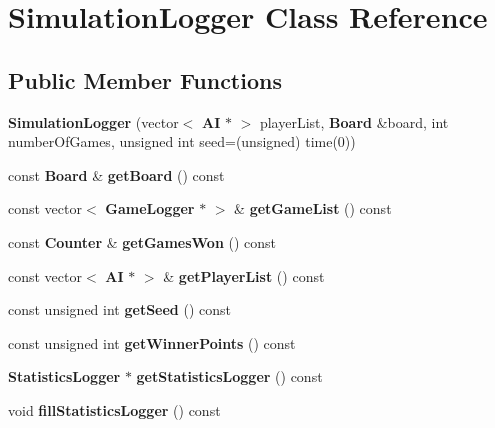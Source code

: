 \section{Simulation\-Logger Class Reference}
\label{class_simulation_logger}
\subsection*{Public Member Functions}
\begin{DoxyCompactItemize}
\item 
{\bfseries Simulation\-Logger} (vector$<$ {\bf A\-I} $\ast$ $>$ player\-List, {\bf Board} \&board, int number\-Of\-Games, unsigned int seed=(unsigned) time(0))\label{class_simulation_logger_a1bd6ad9e03211cee83757c567c14195b}

\item 
const {\bf Board} \& {\bfseries get\-Board} () const \label{class_simulation_logger_a5ed89aaa870ff9323be5f8f82da95f4a}

\item 
const vector$<$ {\bf Game\-Logger} $\ast$ $>$ \& {\bfseries get\-Game\-List} () const \label{class_simulation_logger_af92f6d16f918a385ccfa0d9b6a8823b3}

\item 
const {\bf Counter} \& {\bfseries get\-Games\-Won} () const \label{class_simulation_logger_a1a8d238597cef51d85bef2cd397bfb4d}

\item 
const vector$<$ {\bf A\-I} $\ast$ $>$ \& {\bfseries get\-Player\-List} () const \label{class_simulation_logger_ac089019f8358d4bb5bb5d92504e40ca4}

\item 
const unsigned int {\bfseries get\-Seed} () const \label{class_simulation_logger_ac9f1225d9d932eb90ccdde1c4149d212}

\item 
const unsigned int {\bfseries get\-Winner\-Points} () const \label{class_simulation_logger_af90bd066ae1f1012384f87662f19eb8f}

\item 
{\bf Statistics\-Logger} $\ast$ {\bfseries get\-Statistics\-Logger} () const \label{class_simulation_logger_a86e60c3604076ccb80c776a9cd11cb6f}

\item 
void {\bfseries fill\-Statistics\-Logger} () const \label{class_simulation_logger_a4f272cd32681f0870a8bbbb244acbf5f}


\end{DoxyCompactItemize}

